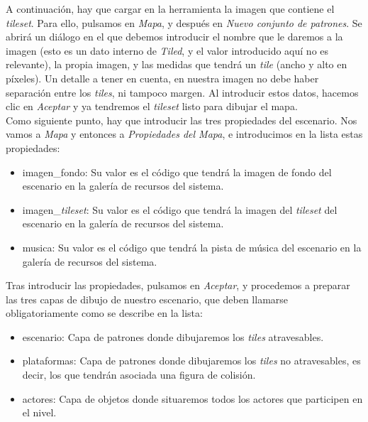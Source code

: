 A continuación, hay que cargar en la herramienta la imagen que contiene el \emph{tileset}. Para ello, pulsamos en \emph{Mapa}, y después en \emph{Nuevo conjunto de patrones}. Se abrirá un diálogo en el que debemos introducir el nombre que le daremos a la imagen (esto es un dato interno de \emph{Tiled}, y el valor introducido aquí no es relevante), la propia imagen, y las medidas que tendrá un \emph{tile} (ancho y alto en píxeles). Un detalle a tener en cuenta, en nuestra imagen no debe haber separación entre los \emph{tiles}, ni tampoco margen. Al introducir estos datos, hacemos clic en \emph{Aceptar} y ya tendremos el \emph{tileset} listo para dibujar el mapa.\\

Como siguiente punto, hay que introducir las tres propiedades del escenario. Nos vamos a \emph{Mapa} y entonces a \emph{Propiedades del Mapa}, e introducimos en la lista estas propiedades:

\begin{itemize}
\item imagen\_fondo: Su valor es el código que tendrá la imagen de fondo del escenario en la galería de recursos del sistema.
\item imagen\_\emph{tileset}: Su valor es el código que tendrá la imagen del \emph{tileset} del escenario en la galería de recursos del sistema.
\item musica: Su valor es el código que tendrá la pista de música del escenario en la galería de recursos del sistema.
\end{itemize}

Tras introducir las propiedades, pulsamos en \emph{Aceptar}, y procedemos a preparar las tres capas de dibujo de nuestro escenario, que deben llamarse obligatoriamente como se describe en la lista:

\begin{itemize}
\item escenario: Capa de patrones donde dibujaremos los \emph{tiles} atravesables.
\item plataformas: Capa de patrones donde dibujaremos los \emph{tiles} no atravesables, es decir, los que tendrán asociada una figura de colisión.
\item actores: Capa de objetos donde situaremos todos los actores que participen en el nivel.
\end{itemize}

